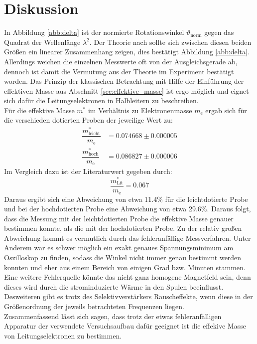 \section{Diskussion}
\label{sec:Diskussion}
In Abbildung \ref{abb:delta} ist der normierte Rotationswinkel $\vartheta_\mathrm{norm}$ gegen das Quadrat der Wellenlänge $\lambda^2$. Der Theorie nach sollte sich zwischen
diesen beiden Größen ein linearer Zusammenhang zeigen, dies bestätigt Abbildung \ref{abb:delta}. Allerdings weichen die einzelnen Messwerte oft von der Ausgleichsgerade ab, dennoch ist damit die Vermutung aus der Theorie im Experiment bestätigt worden.
Das Prinzip der klassischen Betrachtung mit Hilfe der Einführung der effektiven Masse aus Abschnitt \ref{sec:effektive_masse} ist ergo möglich und
eignet sich dafür die Leitungselektronen in Halbleitern zu beschreiben. \\
Für die effektive Masse $m^*$ im Verhältnis zu Elektronenmasse $m_\mathrm{e}$ ergab sich für die verschieden dotierten Proben der jeweilige Wert zu:
\begin{align*}
  \dfrac{m^*_{\mathrm{leicht}}}{m_\mathrm{e}} &= 0.074668 \pm 0.000005 \\
  \dfrac{m^*_{\mathrm{hoch}}}{m_\mathrm{e}} &= 0.086827 \pm 0.000006
\end{align*}
Im Vergleich dazu ist der Literaturwert \cite[1]{Bild6} gegeben durch:
\begin{equation*}
  \dfrac{m^*_{\mathrm{Lit}}}{m_\mathrm{e}}=0.067
\end{equation*}
Daraus ergibt sich eine Abweichung von etwa 11.4\% für die leichtdotierte Probe und bei der hochdotierten Probe eine Abweichung von etwa 29.6\%.
Daraus folgt, dass die Messung mit der leichtdotierten Probe die effektive Masse genauer bestimmen konnte, als die mit der hochdotierten Probe. Zu der relativ großen Abweichung kommt es
vermutlich durch das fehleranfällige Messverfahren. Unter Anderem war es schwer möglich ein exakt genaues Spannungsminimum am Oszilloskop zu finden, sodass die Winkel nicht immer genau bestimmt
werden konnten und eher aus einem Bereich von einigen Grad bzw. Minuten stammen. Eine weitere Fehlerquelle könnte das nicht ganz homogene Magnetfeld sein, denn dieses wird durch die
strominduzierte Wärme in den Spulen beeinflusst. Desweiteren gibt es trotz des Selektivverstärkers Rauscheffekte, wenn diese in der Größenordnung der jeweils betrachteten Frequenzen liegen.\\
Zusammenfassend lässt sich sagen, dass trotz der etwas fehleranfälligen Apparatur der verwendete Versuchsaufbau dafür geeignet ist die effekive Masse von Leitungselektronen zu bestimmen.
